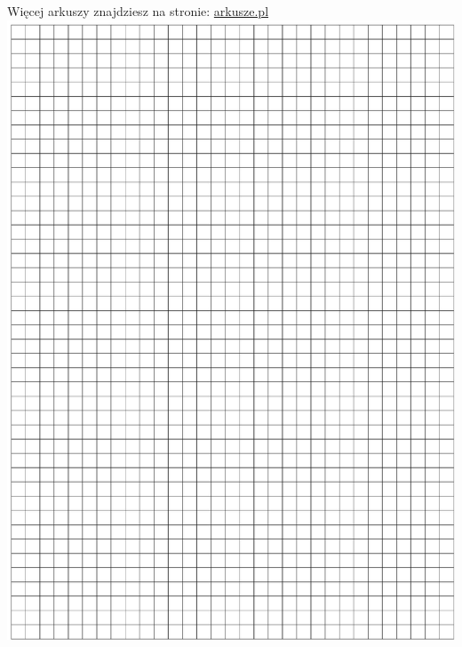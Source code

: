\documentclass[10pt]{article}
\begin{document}
Więcej arkuszy znajdziesz na stronie: \href{http://arkusze.pl}{arkusze.pl}\\
\includegraphics[max width=\textwidth, center]{2024_11_21_f29375993e8c629c464fg-10}\\
\end{document}
